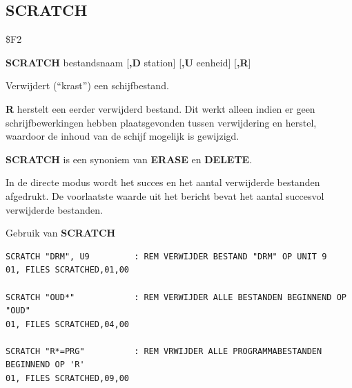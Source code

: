 \subsection{SCRATCH}
\begin{description}[leftmargin=2cm,style=nextline]
\item [Token:]    \$F2

\item [Formaat:]   {\bf SCRATCH} bestandsnaam [{\bf,D} station] [{\bf,U} eenheid] [{\bf,R}]

\item [Gebruik:]    Verwijdert (``krast'') een schijfbestand.

                  \filenamedefinition

                  \drivedefinition

                  \unitdefinition

                  {\bf R} herstelt een eerder verwijderd bestand. Dit werkt alleen indien er geen schrijfbewerkingen hebben plaatsgevonden tussen verwijdering en herstel, waardoor de inhoud van de schijf mogelijk is gewijzigd.

\item [Opmerkingen:]  {\bf SCRATCH} is een synoniem van {\bf ERASE} en {\bf DELETE}.

                  In de directe modus wordt het succes en het aantal verwijderde bestanden afgedrukt. De voorlaatste waarde uit het bericht bevat het aantal succesvol verwijderde bestanden.

\item [Voorbeelden:] Gebruik van {\bf SCRATCH}

\begin{tcolorbox}[colback=black,coltext=white]
\verbatimfont{\codefont}
\begin{verbatim}
SCRATCH "DRM", U9         : REM VERWIJDER BESTAND "DRM" OP UNIT 9
01, FILES SCRATCHED,01,00

SCRATCH "OUD*"            : REM VERWIJDER ALLE BESTANDEN BEGINNEND OP "OUD"
01, FILES SCRATCHED,04,00

SCRATCH "R*=PRG"          : REM VRWIJDER ALLE PROGRAMMABESTANDEN BEGINNEND OP 'R'
01, FILES SCRATCHED,09,00
\end{verbatim}
\end{tcolorbox}
\end{description}


\newpage
